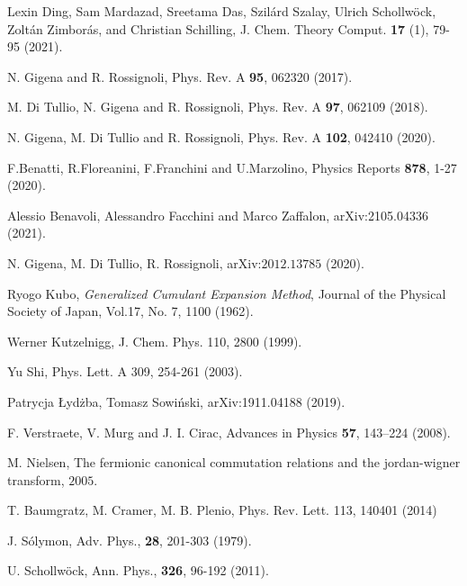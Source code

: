 \documentclass[prb,reprint,showpacs,twocolumn,superscriptaddress]{revtex4-2}
\begin{document}
\begin{thebibliography}{99}
 Lexin Ding, Sam Mardazad, Sreetama Das, Szilárd Szalay, Ulrich Schollwöck, Zoltán Zimborás, and Christian Schilling,
J. Chem. Theory Comput. \textbf{17} (1), 79-95 (2021).

 N. Gigena and R. Rossignoli,
Phys. Rev. A \textbf{ 95}, 062320 (2017).

 M. Di Tullio, N. Gigena and R. Rossignoli,
Phys. Rev. A \textbf{97}, 062109 (2018).

 N. Gigena, M. Di Tullio and R. Rossignoli,
Phys. Rev. A \textbf{102}, 042410 (2020).

 F.Benatti, R.Floreanini, F.Franchini and U.Marzolino, Physics Reports \textbf{878}, 1-27 (2020).

  Alessio Benavoli, Alessandro Facchini and Marco Zaffalon, arXiv:2105.04336 (2021).

 N. Gigena, M. Di Tullio, R. Rossignoli, arXiv:$2012.13785$ (2020).

 Ryogo Kubo, \textit{Generalized Cumulant Expansion Method}, Journal of the Physical Society of Japan, Vol.17, No. 7, 1100 (1962).

 Werner Kutzelnigg,
J. Chem. Phys. 110, 2800 (1999).


 Yu Shi, Phys. Lett. A 309, 254-261 (2003).

Patrycja Łydżba, Tomasz Sowiński, 
	arXiv:1911.04188 (2019).

 F. Verstraete, V. Murg and J. I. Cirac,  Advances in Physics \textbf{57}, 143–224 (2008).

 M. Nielsen,
The fermionic canonical commutation relations and the jordan-wigner transform, $2005$.

 T. Baumgratz, M. Cramer, M. B. Plenio, 
Phys. Rev. Lett. 113, 140401 (2014)


  J. S\'olymon, Adv. Phys., {\bf 28}, 201-303 (1979).

 U. Schollw\"ock, Ann. Phys., \textbf{326}, 96-192 (2011).


\end{thebibliography}
\end{document}
